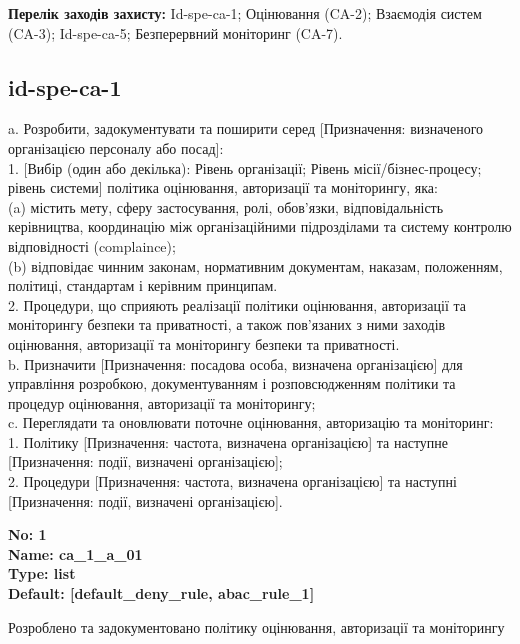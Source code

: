 \documentclass{article}
\begin{document}
\textbf{Перелік заходів захисту:} Id-spe-ca-1; Оцінювання (CA-2); Взаємодія систем (CA-3); Id-spe-ca-5; Безперервний моніторинг (CA-7).

\subsection{id-spe-ca-1}
a. Розробити, задокументувати та поширити серед [Призначення: визначеного організацією персоналу або посад]:\\ 
1. [Вибір (один або декілька): Рівень організації; Рівень місії/бізнес-процесу; рівень системи] політика оцінювання, авторизації та моніторингу, яка:\\ 
(a) містить мету, сферу застосування, ролі, обов'язки, відповідальність керівництва, координацію між організаційними підрозділами та систему контролю відповідності (complaince);\\ 
(b) відповідає чинним законам, нормативним документам, наказам, положенням, політиці, стандартам і керівним принципам.\\ 
2. Процедури, що сприяють реалізації політики оцінювання, авторизації та моніторингу безпеки та приватності, а також пов'язаних з ними заходів оцінювання, авторизації та моніторингу безпеки та приватності.\\ 
b. Призначити [Призначення: посадова особа, визначена організацією] для управління розробкою, документуванням і розповсюдженням політики та процедур оцінювання, авторизації та моніторингу;\\ 
c. Переглядати та оновлювати поточне оцінювання, авторизацію та моніторинг:\\ 
1. Політику [Призначення: частота, визначена організацією] та наступне [Призначення: події, визначені організацією];\\ 
2. Процедури [Призначення: частота, визначена організацією] та наступні [Призначення: події, визначені організацією].

\vspace{10pt}
{\footnotesize\bfseries
No: 1\\
Name: ca\_\allowbreak{}1\_\allowbreak{}a\_\allowbreak{}01\\
Type: list\\
Default: [\textquotedbl{}default\_\allowbreak{}deny\_\allowbreak{}rule\textquotedbl{}, \textquotedbl{}abac\_\allowbreak{}rule\_\allowbreak{}1\textquotedbl{}]
}

{\footnotesize Розроблено та задокументовано політику оцінювання, авторизації та моніторингу}
\end{document}

